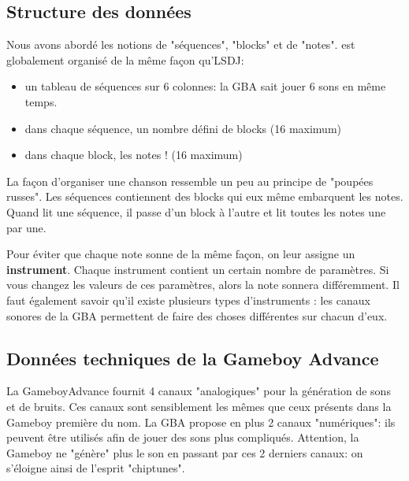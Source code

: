 \documentclass[12pt,a4paper]{article}
\begin{document}
    
    \subsection{Structure des données}
    
    Nous avons abordé les notions de "séquences", "blocks" et de "notes".
    \FAT est globalement organisé de la même façon qu'LSDJ:
    \medskip

    \begin{itemize}
        \item{un tableau de séquences sur 6 colonnes: la GBA sait jouer 6 sons en même temps.}
        \item{dans chaque séquence, un nombre défini de blocks (16 maximum)}
        \item{dans chaque block, les notes ! (16 maximum)}
    \end{itemize}
    \medskip
    
    La façon d'organiser une chanson ressemble un peu au principe de "poupées russes".
    Les séquences contiennent des blocks qui eux même embarquent les notes.
    Quand \FAT lit une séquence, il passe d'un block à l'autre et lit toutes les notes une par une.
    \medskip
    
    Pour éviter que chaque note sonne de la même façon, on leur assigne un {\bf instrument}.
    Chaque instrument contient un certain nombre de paramètres.
    Si vous changez les valeurs de ces paramètres, alors la note sonnera différemment.
    Il faut également savoir qu'il existe plusieurs types d'instruments : les canaux sonores de la GBA permettent de faire des choses différentes sur chacun d'eux.
    
    \subsection{Données techniques de la Gameboy Advance}
    
    La GameboyAdvance fournit 4 canaux "analogiques" pour la génération de sons et de bruits.
    Ces canaux sont sensiblement les mêmes que ceux présents dans la Gameboy première du nom.
    La GBA propose en plus 2 canaux "numériques": ils peuvent être utilisés afin de jouer des sons plus compliqués.
    Attention, la Gameboy ne "génère" plus le son en passant par ces 2 derniers canaux: on s'éloigne ainsi de l'esprit "chiptunes".
    
\end{document}
